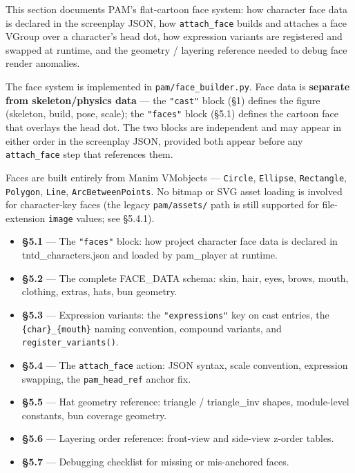 \documentclass[
  12pt,
  letterpaper,
]{book}
\providecommand{\tightlist}{%
  \setlength{\itemsep}{0pt}\setlength{\parskip}{0pt}}
\begin{document}
This section documents PAM's flat-cartoon face system: how character
face data is declared in the screenplay JSON, how \texttt{attach\_face}
builds and attaches a face VGroup over a character's head dot, how
expression variants are registered and swapped at runtime, and the
geometry / layering reference needed to debug face render anomalies.

The face system is implemented in \texttt{pam/face\_builder.py}. Face
data is \textbf{separate from skeleton/physics data} --- the
\texttt{"cast"} block (§1) defines the figure (skeleton, build, pose,
scale); the \texttt{"faces"} block (§5.1) defines the cartoon face that
overlays the head dot. The two blocks are independent and may appear in
either order in the screenplay JSON, provided both appear before any
\texttt{attach\_face} step that references them.

Faces are built entirely from Manim VMobjects --- \texttt{Circle},
\texttt{Ellipse}, \texttt{Rectangle}, \texttt{Polygon}, \texttt{Line},
\texttt{ArcBetweenPoints}. No bitmap or SVG asset loading is involved
for character-key faces (the legacy \texttt{pam/assets/} path is still
supported for file-extension \texttt{image} values; see §5.4.1).

\begin{itemize}
\tightlist
\item
  \textbf{§5.1} --- The \texttt{"faces"} block: how project character
  face data is declared in tntd\_characters.json and loaded by
  pam\_player at runtime.
\item
  \textbf{§5.2} --- The complete FACE\_DATA schema: skin, hair, eyes,
  brows, mouth, clothing, extras, hats, bun geometry.
\item
  \textbf{§5.3} --- Expression variants: the \texttt{"expressions"} key
  on cast entries, the \texttt{\{char\}\_\{mouth\}} naming convention,
  compound variants, and \texttt{register\_variants()}.
\item
  \textbf{§5.4} --- The \texttt{attach\_face} action: JSON syntax, scale
  convention, expression swapping, the \texttt{pam\_head\_ref} anchor
  fix.
\item
  \textbf{§5.5} --- Hat geometry reference: triangle / triangle\_inv
  shapes, module-level constants, bun coverage geometry.
\item
  \textbf{§5.6} --- Layering order reference: front-view and side-view
  z-order tables.
\item
  \textbf{§5.7} --- Debugging checklist for missing or mis-anchored
  faces.
\end{itemize}
\end{document}
